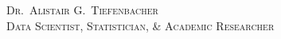 \documentclass[a4paper, oneside, final, 10pt]{scrartcl}
\begin{document}
{\centering
{\huge \textsc{Dr.~Alistair G.~Tiefenbacher}}\\
\textsc{Data Scientist, Statistician, \& Academic Researcher}
\vspace{0.4cm}
\par}


\vfill


% 

\vfill


\vfill


%

%

%

\vfill


% 

\vfill


\vfill
\end{document}
